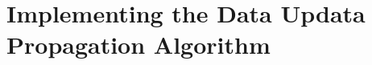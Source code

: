 

\section{Implementing the Data Updata Propagation Algorithm}
\label{sec:implementing-the-data-updata-propagation-algorithm}



